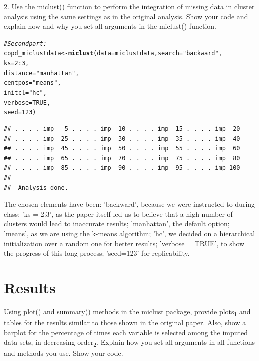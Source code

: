 \documentclass[a4paper,10pt]{article}\usepackage[]{graphicx}\usepackage[]{xcolor}
\makeatletter
\newcommand{\hlnum}[1]{\textcolor[rgb]{0.686,0.059,0.569}{#1}}%
\newcommand{\hlsng}[1]{\textcolor[rgb]{0.192,0.494,0.8}{#1}}%
\newcommand{\hlcom}[1]{\textcolor[rgb]{0.678,0.584,0.686}{\textit{#1}}}%
\newcommand{\hlopt}[1]{\textcolor[rgb]{0,0,0}{#1}}%
\newcommand{\hldef}[1]{\textcolor[rgb]{0.345,0.345,0.345}{#1}}%
\newcommand{\hlkwb}[1]{\textcolor[rgb]{0.69,0.353,0.396}{#1}}%
\newcommand{\hlkwc}[1]{\textcolor[rgb]{0.333,0.667,0.333}{#1}}%
\newcommand{\hlkwd}[1]{\textcolor[rgb]{0.737,0.353,0.396}{\textbf{#1}}}%
\newenvironment{kframe}{%
 \def\at@end@of@kframe{}%
 \ifinner\ifhmode%
  \def\at@end@of@kframe{\end{minipage}}%
  \begin{minipage}{\columnwidth}%
 \fi\fi%
 \def\FrameCommand##1{\hskip\@totalleftmargin \hskip-\fboxsep
 \colorbox{shadecolor}{##1}\hskip-\fboxsep
     \hskip-\linewidth \hskip-\@totalleftmargin \hskip\columnwidth}%
 \MakeFramed {\advance\hsize-\width
   \@totalleftmargin\z@ \linewidth\hsize
   \@setminipage}}%
 {\par\unskip\endMakeFramed%
 \at@end@of@kframe}
\newenvironment{knitrout}{}{} %
\makeatother
\begin{document}
2. Use the miclust() function to perform the integration of missing data in cluster
analysis using the same settings as in the original analysis. Show your code and
explain how and why you set all arguments in the miclust() function.

\begin{knitrout}
\color{fgcolor}\begin{kframe}
\begin{alltt}
\hlcom{# Second part:}
\hldef{copd_miclustdata} \hlkwb{<-} \hlkwd{miclust}\hldef{(}\hlkwc{data} \hldef{= miclustdata,}\hlkwc{search} \hldef{=} \hlsng{"backward"}\hldef{,}
                            \hlkwc{ks} \hldef{=} \hlnum{2}\hlopt{:}\hlnum{3}\hldef{,}
                            \hlkwc{distance} \hldef{=} \hlsng{"manhattan"}\hldef{,}
                            \hlkwc{centpos} \hldef{=} \hlsng{"means"}\hldef{,}
                            \hlkwc{initcl} \hldef{=} \hlsng{"hc"}\hldef{,}
                            \hlkwc{verbose} \hldef{=} \hlnum{TRUE}\hldef{,}
                            \hlkwc{seed} \hldef{=} \hlnum{123}\hldef{)}
\end{alltt}
\begin{verbatim}
## . . . . imp   5 . . . . imp  10 . . . . imp  15 . . . . imp  20 
## . . . . imp  25 . . . . imp  30 . . . . imp  35 . . . . imp  40 
## . . . . imp  45 . . . . imp  50 . . . . imp  55 . . . . imp  60 
## . . . . imp  65 . . . . imp  70 . . . . imp  75 . . . . imp  80 
## . . . . imp  85 . . . . imp  90 . . . . imp  95 . . . . imp 100 
## 
##  Analysis done.
\end{verbatim}
\end{kframe}
\end{knitrout}


The chosen elements have been: 'backward', because we were instructed to
during class; 'ks = 2:3', as the paper itself led us to believe that a high
number of clusters would lead to inaccurate  results; 'manhattan', the default
option; 'means', as we are using the k-means algorithm; 'hc', we decided on 
a hierarchical initialization over a random one for better results;
'verbose = TRUE', to show the progress of this long process; 'seed=123' for replicability.


\section{Results}
Using plot() and summary() methods in the miclust package, provide plots\textsubscript{1} and tables
for the results similar to those shown in the original paper. Also, show a barplot for the
percentage of times each variable is selected among the imputed data sets, in decreasing
order\textsubscript{2}. Explain how you set all arguments in all functions and methods you use. Show
your code.
\end{document}
